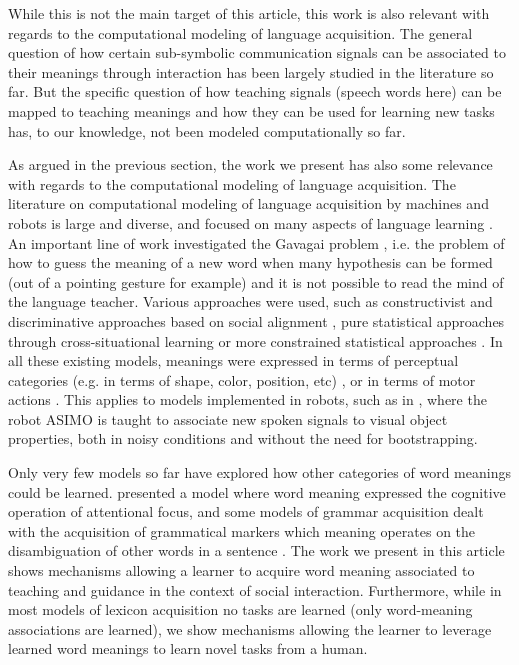 While this is not the main target of this article, this work is also relevant with regards to the computational modeling of language acquisition. The general question of how certain sub-symbolic communication signals can be associated to their meanings through interaction has been largely studied in the literature so far. But the specific question of how teaching signals (speech words here) can be mapped to teaching meanings and how they can be used for learning new tasks has, to our knowledge, not been modeled computationally so far. 

As argued in the previous section, the work we present has also some relevance with regards to the computational modeling of language acquisition. The literature on computational modeling of language acquisition by machines and robots is large and diverse, and focused on many aspects of language learning \cite{steels2012grounding,steels2002aibos, cangelosi2010integration, kaplan2008computational, steels2003evolving, brent1997computational, yu2007unified}. An important line of work investigated the Gavagai problem \cite{quine1964word}, i.e. the problem of how to guess the meaning of a new word when many hypothesis can be formed (out of a pointing gesture for example) and it is not possible to read the mind of the language teacher. Various approaches were used, such as constructivist and discriminative approaches based on social alignment \cite{steels06spatialLanguage, steels2008can}, pure statistical approaches through cross-situational learning \cite{xu2007word, smith2008infants} or more constrained statistical approaches \cite{roy2005semiotic, yu2007unified}. In all these existing models, meanings were expressed in terms of perceptual categories (e.g. in terms of shape, color, position, etc) \cite{steels06spatialLanguage, steels2008can,yu2007unified}, or in terms of motor actions \cite{steels2008robot, Massera2010,sugita05a}. This applies to models implemented in robots, such as in \cite{heckmann2009teaching}, where  the robot ASIMO is taught to associate new spoken signals to visual object properties, both in noisy conditions and without the need for bootstrapping. 

Only very few models so far have explored how other categories of word meanings could be learned. \cite{cederborg2011imitating} presented a model where word meaning expressed the cognitive operation of attentional focus, and some models of grammar acquisition dealt with the acquisition of grammatical markers which meaning operates on the disambiguation of other words in a sentence \cite{steels2012fluid}. 
The work we present in this article shows mechanisms allowing a learner to acquire word meaning associated to teaching and guidance in the context of social interaction. Furthermore, while in most models of lexicon  acquisition no tasks are learned (only word-meaning associations are learned), we show mechanisms allowing the learner to leverage learned word meanings to learn novel tasks from a human.

